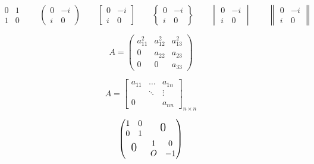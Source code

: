 \documentclass{ctexart}
\begin{document}
    \[
      \begin{matrix}
        0 & 1 \\
        1 & 0 
      \end{matrix}  \qquad
      \begin{pmatrix}
          0 & -i \\
          i & 0
      \end{pmatrix} \qquad
      \begin{bmatrix}
        0 & -i \\
        i & 0
    \end{bmatrix} \qquad
    \begin{Bmatrix}
      0 & -i \\
      i & 0
    \end{Bmatrix} \qquad
    \begin{vmatrix}
      0 & -i \\
      i & 0
    \end{vmatrix} \qquad
    \begin{Vmatrix}
      0 & -i \\
      i & 0
    \end{Vmatrix} \qquad
    \]

    \[
        A= \begin{pmatrix}
        a_{11}^2 & a_{12}^2 & a_{13}^2 \\
        0 & a_{22} & a_{23} \\
        0 & 0 & a_{33}
        \end{pmatrix}
    \]

    \[
        A=\begin{bmatrix}
        a_{11} & \dots & a_{1n} \\
        & \ddots & \vdots \\
        0 & & a_{nn}
        \end{bmatrix}_{n \times n}    
    \]

    \[
    \begin{pmatrix}
        \begin{matrix}1&0\\0&1 \end{matrix} & \text{\Large 0}\\
        \text{\Large 0} & \begin{matrix} 1&0\\O&-1\end{matrix}
    \end{pmatrix}
    \]
\end{document}
